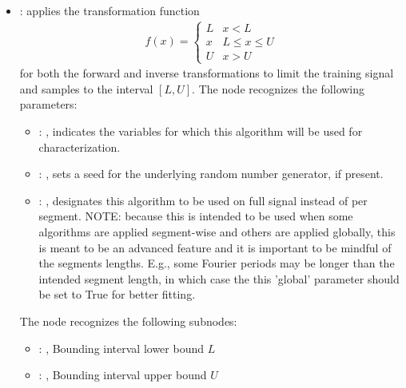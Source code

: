 \begin{itemize}
    \item {}:
      applies the transformation function       \begin{align}         f(x) = \begin{cases}
      L & x < L \\           x & L \leq x \leq U \\           U & x > U         \end{cases}
      \end{align}     for both the forward and inverse transformations to limit the training
      signal and samples to the interval $[L, U]$.
      The  node recognizes the following parameters:
        \begin{itemize}
          \item {}: ,
            indicates the variables for which this algorithm will be used for characterization.
          \item {}: ,
            sets a seed for the underlying random number generator, if present.
          \item {}: ,
            designates this algorithm to be used on full signal instead of per
            segment. NOTE: because this is intended to be used when some algorithms are
            applied segment-wise and others are applied globally, this is meant to be an
            advanced feature and it is important to be mindful of the segments lengths.
            E.g., some Fourier periods may be longer than the intended segment length, in
            which case the this 'global' parameter should be set to True for better
            fitting. 
      \end{itemize}

      The  node recognizes the following subnodes:
      \begin{itemize}
        \item {}: ,
          Bounding interval lower bound $L$

        \item {}: ,
          Bounding interval upper bound $U$
      \end{itemize}


\end{itemize}
